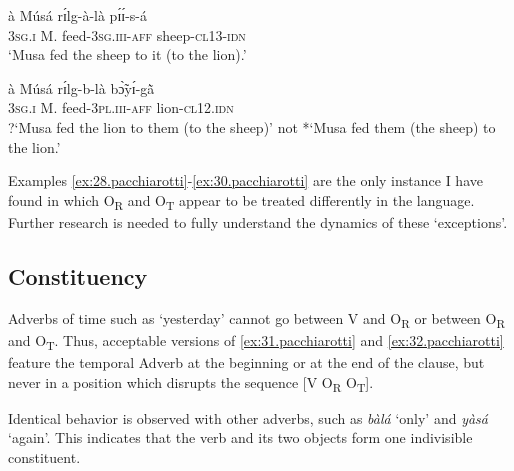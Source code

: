 \documentclass[output=paper]{langsci/langscibook}
\begin{document}
\ea
\label{ex:29.pacchiarotti}
\gll \`{a}    M\'{u}s\'{a}    rɪ́lg-\`{a}-l\`{a}    pɪ́ɪ́-s-\'{a}\\
\textsc{3sg.i  }  M.    feed-\textsc{3sg.iii-aff}  sheep-\textsc{cl13-idn}\\
\glt `Musa fed the sheep to it (to the lion).'
\z

\ea
\label{ex:30.pacchiarotti}
\gll \`{a}    M\'{u}s\'{a}  rɪ́lg-b-l\`{a}     bɔ̃̀yɪ́-g\`{\~{a}} \\
\textsc{3sg.i  }  M.  feed-\textsc{3pl.iii-aff  }  lion-\textsc{cl12.idn}\\
\glt
?`Musa fed the lion to them (to the sheep)' not *`Musa fed them (the sheep) to the lion.'  
\z

Examples \ref{ex:28.pacchiarotti}{}-\ref{ex:30.pacchiarotti} are the only instance I have found in which O\textsubscript{R} and O\textsubscript{T} appear to be treated differently in the language. Further research is needed to fully understand the dynamics of these `exceptions'.

\subsection{Constituency}\label{§4.5:constituency.pacchiarotti}

Adverbs of time such as `yesterday' cannot go between V and O\textsubscript{R} or between O\textsubscript{R} and O\textsubscript{T}. Thus, acceptable versions of \ref{ex:31.pacchiarotti} and \ref{ex:32.pacchiarotti} feature the temporal Adverb at the beginning or at the end of the clause, but never in a position which disrupts the sequence [V O\textsubscript{R} O\textsubscript{T}].

\z

\z

Identical behavior is observed with other adverbs, such as \textit{b\`{a}l\'{a}} `only' and \textit{y\`{a}s\'{a}} `again'. This indicates that the verb and its two objects form one indivisible constituent.
\end{document}
